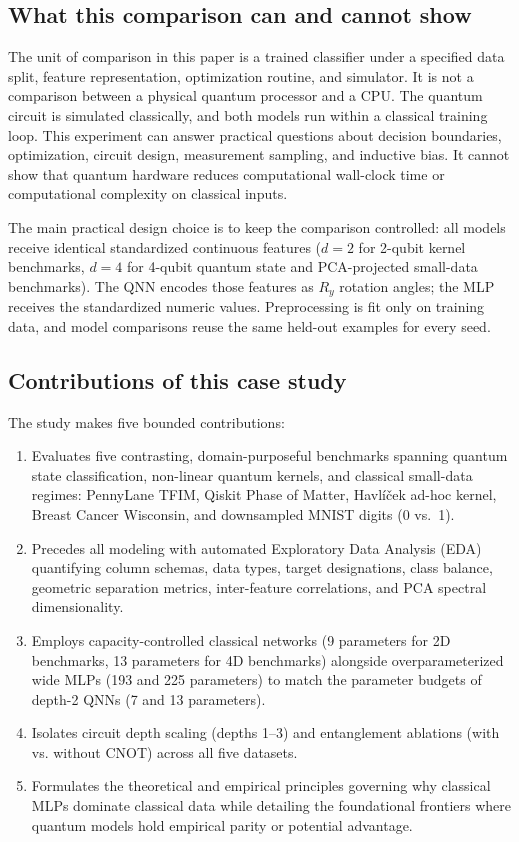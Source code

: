 \subsection{What this comparison can and cannot show}
The unit of comparison in this paper is a trained classifier under a specified data split, feature representation, optimization routine, and simulator. It is not a comparison between a physical quantum processor and a CPU. The quantum circuit is simulated classically, and both models run within a classical training loop. This experiment can answer practical questions about decision boundaries, optimization, circuit design, measurement sampling, and inductive bias. It cannot show that quantum hardware reduces computational wall-clock time or computational complexity on classical inputs.

The main practical design choice is to keep the comparison controlled: all models receive identical standardized continuous features ($d=2$ for 2-qubit kernel benchmarks, $d=4$ for 4-qubit quantum state and PCA-projected small-data benchmarks). The QNN encodes those features as $R_y$ rotation angles; the MLP receives the standardized numeric values. Preprocessing is fit only on training data, and model comparisons reuse the same held-out examples for every seed.

\subsection{Contributions of this case study}
The study makes five bounded contributions:
\begin{enumerate}
  \item Evaluates five contrasting, domain-purposeful benchmarks spanning quantum state classification, non-linear quantum kernels, and classical small-data regimes: PennyLane TFIM, Qiskit Phase of Matter, Havl\'i\v{c}ek ad-hoc kernel, Breast Cancer Wisconsin, and downsampled MNIST digits (0 vs.\ 1).
  \item Precedes all modeling with automated Exploratory Data Analysis (EDA) quantifying column schemas, data types, target designations, class balance, geometric separation metrics, inter-feature correlations, and PCA spectral dimensionality.
  \item Employs capacity-controlled classical networks (9 parameters for 2D benchmarks, 13 parameters for 4D benchmarks) alongside overparameterized wide MLPs (193 and 225 parameters) to match the parameter budgets of depth-2 QNNs (7 and 13 parameters).
  \item Isolates circuit depth scaling (depths 1--3) and entanglement ablations (with vs. without CNOT) across all five datasets.
  \item Formulates the theoretical and empirical principles governing why classical MLPs dominate classical data while detailing the foundational frontiers where quantum models hold empirical parity or potential advantage.
\end{enumerate}
